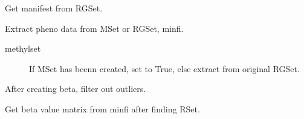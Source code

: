 \documentclass[letterpaper,10pt,english]{sphinxmanual}
\begin{document}
\begin{fulllineitems}
\begin{fulllineitems}
\label{\detokenize{index:pymethylprocess.PreProcessDataTypes.PreProcessIDAT.extract_manifest}}
Get manifest from RGSet.

\end{fulllineitems}


\begin{fulllineitems}
\label{\detokenize{index:pymethylprocess.PreProcessDataTypes.PreProcessIDAT.extract_pheno_data}}
Extract pheno data from MSet or RGSet, minfi.
\begin{description}
\item[{methylset}] \leavevmode
If MSet has beenn created, set to True, else extract from original RGSet.

\end{description}

\end{fulllineitems}


\begin{fulllineitems}
\label{\detokenize{index:pymethylprocess.PreProcessDataTypes.PreProcessIDAT.filter_beta}}
After creating beta, filter out outliers.

\end{fulllineitems}


\begin{fulllineitems}
\label{\detokenize{index:pymethylprocess.PreProcessDataTypes.PreProcessIDAT.get_beta}}
Get beta value matrix from minfi after finding RSet.

\end{fulllineitems}


\end{fulllineitems}
\end{document}
